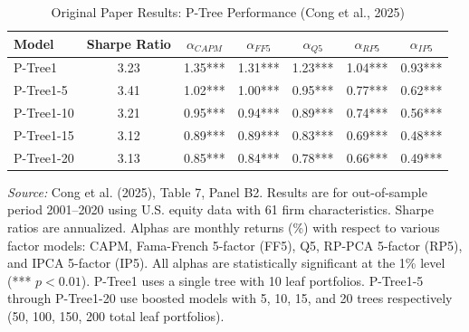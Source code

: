 \begin{table}[htbp]
\centering
\caption{Original Paper Results: P-Tree Performance (Cong et al., 2025)}
\label{tab:original_paper_results}
\setlength{\tabcolsep}{5pt}
\renewcommand{\arraystretch}{1.1}
\small
\begin{tabular}{lcccccc}
\hline
Model & Sharpe Ratio & $\alpha_{CAPM}$ & $\alpha_{FF5}$ & $\alpha_{Q5}$ & $\alpha_{RP5}$ & $\alpha_{IP5}$ \\
\hline
P-Tree1 & 3.23 & 1.35*** & 1.31*** & 1.23*** & 1.04*** & 0.93*** \\
P-Tree1-5 & 3.41 & 1.02*** & 1.00*** & 0.95*** & 0.77*** & 0.62*** \\
P-Tree1-10 & 3.21 & 0.95*** & 0.94*** & 0.89*** & 0.74*** & 0.56*** \\
P-Tree1-15 & 3.12 & 0.89*** & 0.89*** & 0.83*** & 0.69*** & 0.48*** \\
P-Tree1-20 & 3.13 & 0.85*** & 0.84*** & 0.78*** & 0.66*** & 0.49*** \\
\hline
\end{tabular}

\vspace{0.2cm}
\begin{minipage}{0.95\textwidth}
\footnotesize
\textit{Source:} Cong et al. (2025), Table 7, Panel B2. Results are for out-of-sample period 2001--2020
using U.S. equity data with 61 firm characteristics. Sharpe ratios are annualized. Alphas are monthly
returns (\%) with respect to various factor models: CAPM, Fama-French 5-factor (FF5), Q5, RP-PCA 5-factor (RP5),
and IPCA 5-factor (IP5). All alphas are statistically significant at the 1\% level (*** $p<0.01$).
P-Tree1 uses a single tree with 10 leaf portfolios. P-Tree1-5 through P-Tree1-20 use boosted models
with 5, 10, 15, and 20 trees respectively (50, 100, 150, 200 total leaf portfolios).
\end{minipage}
\end{table}
